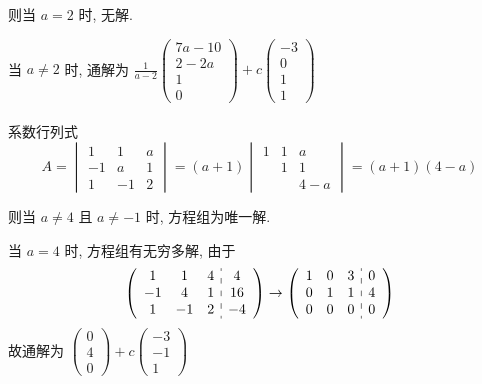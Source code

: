          则当 \( a = 2 \) 时, 无解.

         当 \( a \neq 2 \) 时, 通解为 \( \frac{1}{a-2}\begin{pmatrix}
             7a-10 \\
             2-2a  \\
             1     \\
             0
         \end{pmatrix} + c\begin{pmatrix}
             -3 \\
             0  \\
             1  \\
             1
         \end{pmatrix} \)


     \paragraph{} %
         系数行列式 \[ A = \begin{vmatrix}
                 1  & 1  & a \\
                 -1 & a  & 1 \\
                 1  & -1 & 2
             \end{vmatrix} = (a+1)\begin{vmatrix}
                 1 & 1 & a   \\
                   & 1 & 1   \\
                   &   & 4-a
             \end{vmatrix} = (a+1)(4-a) \]

         则当 \( a \neq 4 \) 且 \( a \neq -1 \) 时, 方程组为唯一解.

         当 \( a = 4 \) 时, 方程组有无穷多解, 由于
         \[ \left(\begin{array}{ccc:c}
                     1  & 1  & 4 & 4  \\
                     -1 & 4  & 1 & 16 \\
                     1  & -1 & 2 & -4
                 \end{array}\right) \rightarrow \left(\begin{array}{ccc:c}
                     1 & 0 & 3 & 0 \\
                     0 & 1 & 1 & 4 \\
                     0 & 0 & 0 & 0
                 \end{array}\right) \]
         故通解为 \(\begin{pmatrix}
             0 \\
             4 \\
             0
         \end{pmatrix} + c\begin{pmatrix}
             -3 \\
             -1 \\
             1
         \end{pmatrix} \)

